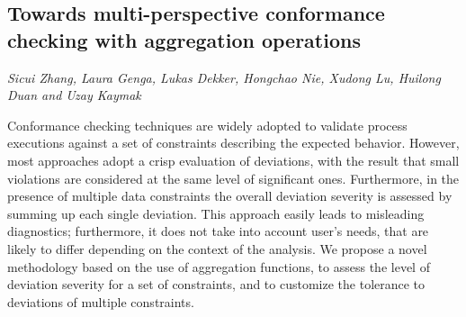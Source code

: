\documentclass[../booklet.tex]{subfiles}
\begin{document}
\subsection[Towards multi-perspective conformance checking with aggregation operations. {\it Sicui Zhang, Laura Genga, Lukas Dekker, Hongchao Nie, Xudong Lu, Huilong Duan and Uzay Kaymak}]{Towards multi-perspective conformance checking with aggregation operations}
      

\begin{center}
  {\it Sicui Zhang, Laura Genga, Lukas Dekker, Hongchao Nie, Xudong Lu, Huilong Duan and Uzay Kaymak}
\end{center}

\vskip 0.8cm


 Conformance checking techniques are widely adopted to validate process executions against a set of constraints describing the expected behavior. However, most approaches adopt a crisp evaluation of
 deviations, with the result that small violations are considered at the same level of significant ones. %
 Furthermore, in the presence of multiple data constraints the overall deviation severity is assessed by summing up each single deviation. This approach easily leads to misleading diagnostics; furthermore, it does not take into account user's needs, that are likely to differ depending on the context of the analysis.
We propose a novel methodology based on the use of aggregation functions, to assess the level of deviation severity for a set of constraints, and to customize the tolerance to deviations of multiple constraints.
\end{document}
